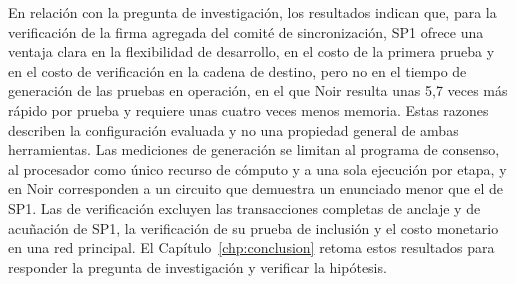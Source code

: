 En relación con la pregunta de investigación, los resultados indican que, para la verificación de
la firma agregada del comité de sincronización, SP1 ofrece una ventaja clara en la flexibilidad de
desarrollo, en el costo de la primera prueba y en el costo de verificación en la cadena de destino,
pero no en el tiempo de generación de las pruebas en operación, en el que Noir resulta unas 5,7
veces más rápido por prueba y requiere unas cuatro veces menos memoria. Estas razones describen la
configuración evaluada y no una propiedad general de ambas herramientas. Las mediciones de
generación se limitan al programa de consenso, al procesador como único recurso de cómputo y a una
sola ejecución por etapa, y en Noir corresponden a un circuito que demuestra un enunciado menor que
el de SP1. Las de verificación excluyen las transacciones completas de anclaje y de acuñación de
SP1, la verificación de su prueba de inclusión y el costo monetario en una red principal. El
Capítulo~\ref{chp:conclusion} retoma estos resultados para responder la pregunta de investigación
y verificar la hipótesis.
